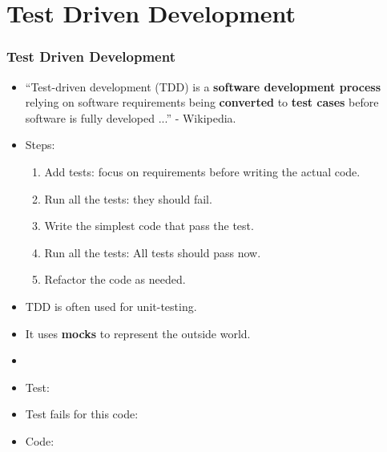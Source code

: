 \documentclass[9pt,xcolor=dvipsnames]{beamer}
\begin{document}
\section{Test Driven Development}

\begin{frame}
  \frametitle{Test Driven Development}
  \begin{overlayarea}{\textwidth}{\textheight}
  \begin{itemize}
    \item<1-2>   ``Test-driven development (TDD) is a \textbf{software development process}
  relying on software requirements being \textbf{converted} to \textbf{test cases}
  before software is fully developed ...'' - Wikipedia.
    \item Steps:
    \begin{enumerate}
    \item<1-3> Add tests: focus on requirements before writing the actual
      code.
    \item<1-2,4> Run all the tests: they should fail.
    \item<1-2,5> Write the simplest code that pass the test.
    \item<1-2,6> Run all the tests: All tests should pass now.
    \item<1-2,7> Refactor the code as needed.
    \end{enumerate}
  \item<only@2> TDD is often used for unit-testing.
  \item<only@2> It uses \textbf{\color{red}mocks} to represent the
    outside world.
  \item<3->
  \item<only@3> Test:
      
    \item<only@4> Test fails for this code:
            
    \item<5-6> Code:
            

  \end{itemize}
  \end{overlayarea}
\end{frame}
\end{document}
